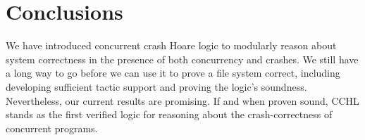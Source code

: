 \section{Conclusions}
\label{sec:conclusions}

We have introduced concurrent crash Hoare logic to modularly reason about system
correctness in the presence of both concurrency and crashes. We still have a
long way to go before we can use it to prove a file system correct, including
developing sufficient tactic support and proving the logic's soundness.
Nevertheless, our current results are promising. If and when proven sound, CCHL
stands as the first verified logic for reasoning about the crash-correctness of
concurrent programs.


